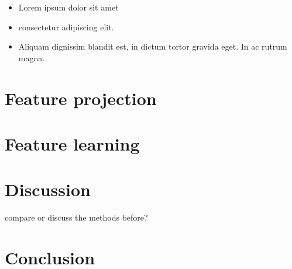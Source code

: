 \documentclass{article}
\begin{document}
\begin{itemize}
\item Lorem ipsum dolor sit amet
\item consectetur adipiscing elit. 
\item Aliquam dignissim blandit est, in dictum tortor gravida eget. In ac rutrum magna.
\end{itemize}

\section{Feature projection}

\section{Feature learning}

\section{Discussion}
compare or discuss the methods before?

\section{Conclusion}

  

\end{document}
